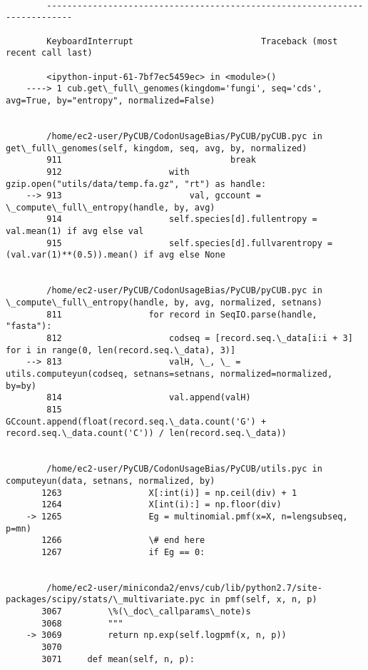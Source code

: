 \documentclass[11pt]{article}
\begin{document}
    \begin{Verbatim}[commandchars=\\\{\}]

        ---------------------------------------------------------------------------

        KeyboardInterrupt                         Traceback (most recent call last)

        <ipython-input-61-7bf7ec5459ec> in <module>()
    ----> 1 cub.get\_full\_genomes(kingdom='fungi', seq='cds', avg=True, by="entropy", normalized=False)
    

        /home/ec2-user/PyCUB/CodonUsageBias/PyCUB/pyCUB.pyc in get\_full\_genomes(self, kingdom, seq, avg, by, normalized)
        911                                 break
        912                     with gzip.open("utils/data/temp.fa.gz", "rt") as handle:
    --> 913                         val, gccount = \_compute\_full\_entropy(handle, by, avg)
        914                     self.species[d].fullentropy = val.mean(1) if avg else val
        915                     self.species[d].fullvarentropy = (val.var(1)**(0.5)).mean() if avg else None


        /home/ec2-user/PyCUB/CodonUsageBias/PyCUB/pyCUB.pyc in \_compute\_full\_entropy(handle, by, avg, normalized, setnans)
        811                 for record in SeqIO.parse(handle, "fasta"):
        812                     codseq = [record.seq.\_data[i:i + 3] for i in range(0, len(record.seq.\_data), 3)]
    --> 813                     valH, \_, \_ = utils.computeyun(codseq, setnans=setnans, normalized=normalized, by=by)
        814                     val.append(valH)
        815                     GCcount.append(float(record.seq.\_data.count('G') + record.seq.\_data.count('C')) / len(record.seq.\_data))


        /home/ec2-user/PyCUB/CodonUsageBias/PyCUB/utils.pyc in computeyun(data, setnans, normalized, by)
       1263                 X[:int(i)] = np.ceil(div) + 1
       1264                 X[int(i):] = np.floor(div)
    -> 1265                 Eg = multinomial.pmf(x=X, n=lengsubseq, p=mn)
       1266                 \# end here
       1267                 if Eg == 0:


        /home/ec2-user/miniconda2/envs/cub/lib/python2.7/site-packages/scipy/stats/\_multivariate.pyc in pmf(self, x, n, p)
       3067         \%(\_doc\_callparams\_note)s
       3068         """
    -> 3069         return np.exp(self.logpmf(x, n, p))
       3070 
       3071     def mean(self, n, p):



\end{Verbatim}
\end{document}
